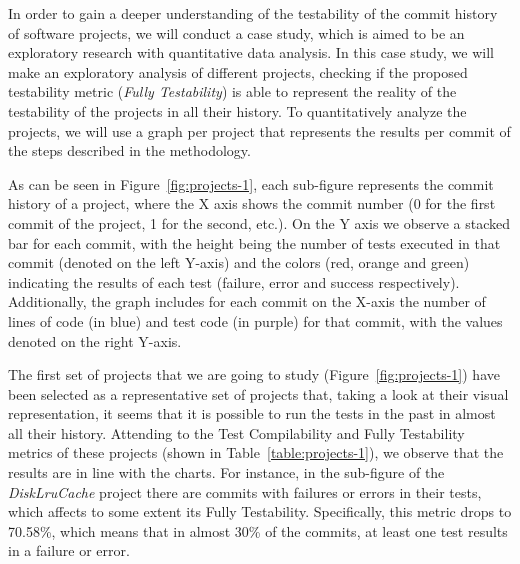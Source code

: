 In order to gain a deeper understanding of the testability of the commit history of software projects, we will conduct a case study, which is aimed to be an exploratory research with quantitative data analysis. 
In this case study, we will make an exploratory analysis of different projects, checking if the proposed testability metric (\textit{Fully Testability}) is able to represent the reality of the testability of the projects in all their history.
To quantitatively analyze the projects, we will use a graph per project that represents the results per commit of the steps described in the methodology. 

As can be seen in Figure~\ref{fig:projects-1}, each sub-figure represents the commit history of a project, where the X axis shows the commit number (0 for the first commit of the project, 1 for the second, etc.). On the Y axis we observe a stacked bar for each commit, with the height being the number of tests executed in that commit (denoted on the left Y-axis) and the colors (red, orange and green) indicating the results of each test (failure, error and success respectively). Additionally, the graph includes for each commit on the X-axis the number of lines of code (in blue) and test code (in purple) for that commit, with the values denoted on the right Y-axis.


The first set of projects that we are going to study (Figure~\ref{fig:projects-1}) have been selected as a representative set of projects that, taking a look at their visual representation, it seems that it is possible to run the tests in the past in almost all their history.
Attending to the Test Compilability and Fully Testability metrics of these projects (shown in Table~\ref{table:projects-1}), we observe that the results are in line with the charts.
For instance, in the sub-figure of the \textit{DiskLruCache} project there are commits with failures or errors in their tests, which affects to some extent its Fully Testability. 
Specifically, this metric drops to 70.58\%, which means that in almost 30\% of the commits, at least one test results in a failure or error.

